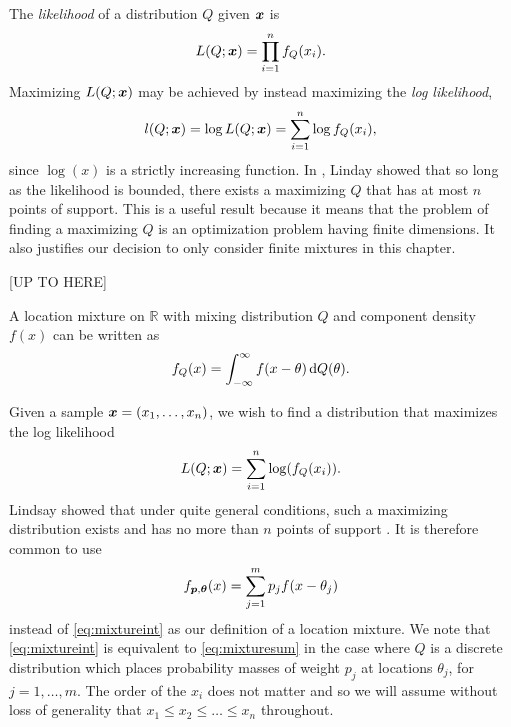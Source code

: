 	The \emph{likelihood} of a distribution $Q$ given ${\bm{{x}}}$ is 
	\begin{equation}
		L(Q;{\bm{{x}}}) = \prod_{i = 1}^n f_Q(x_i).
	\end{equation}
	Maximizing $L(Q;{\bm{{x}}})$ may be achieved by instead maximizing the \emph{log likelihood},
	\begin{equation}
		l(Q; {\bm{{x}}}) = \log L(Q; {\bm{{x}}}) = \sum_{i = 1}^n \log f_Q(x_i),
	\end{equation}
	since $\log(x)$ is a strictly increasing function. In \cite{Lindsay1983-tf}, Linday showed that so long as the likelihood is bounded, there exists a maximizing $Q$ that has at most $n$ points of support. This is a useful result because it means that the problem of finding a maximizing $Q$ is an optimization problem having finite dimensions. It also justifies our decision to only consider finite mixtures in this chapter.

	[UP TO HERE]


	A location mixture on $\mathbb{R}$ with mixing distribution $Q$ and component density $f(x)$ can be written as
	\begin{equation}
		f_Q(x) = \int_{-\infty}^\infty f(x-\theta) \, \mathrm{d} Q(\theta).
	\label{eq:mixtureint}
	\end{equation}

	Given a sample ${\bm{{x}}} = (x_1,\dots,x_n)$, we wish to find a distribution that maximizes the log likelihood	
	\begin{equation}
		L(Q;{\bm{{x}}}) = \sum_{i = 1}^n \log(f_Q(x_i)).
	\label{eq:loglikelihood}
	\end{equation}
	Lindsay showed that under quite general conditions, such a maximizing distribution exists and has no more than $n$ points of support \cite{Lindsay1983-tf}. It is therefore common to use
	\begin{equation}
		f_{{\bm{{p}}},{\bm{{\theta}}}}(x) = \sum_{j = 1}^m p_j f(x - \theta_j)
	\label{eq:mixturesum}
	\end{equation}
	instead of \eqref{eq:mixtureint} as our definition of a location mixture. We note that \eqref{eq:mixtureint} is equivalent to \eqref{eq:mixturesum} in the case where $Q$ is a discrete distribution which places probability masses of weight $p_j$ at locations $\theta_j$, for $j = 1,\dots,m$. The order of the $x_i$ does not matter and so we will assume without loss of generality that $x_1 \leq x_2 \leq \dots \leq x_n$ throughout.
	

